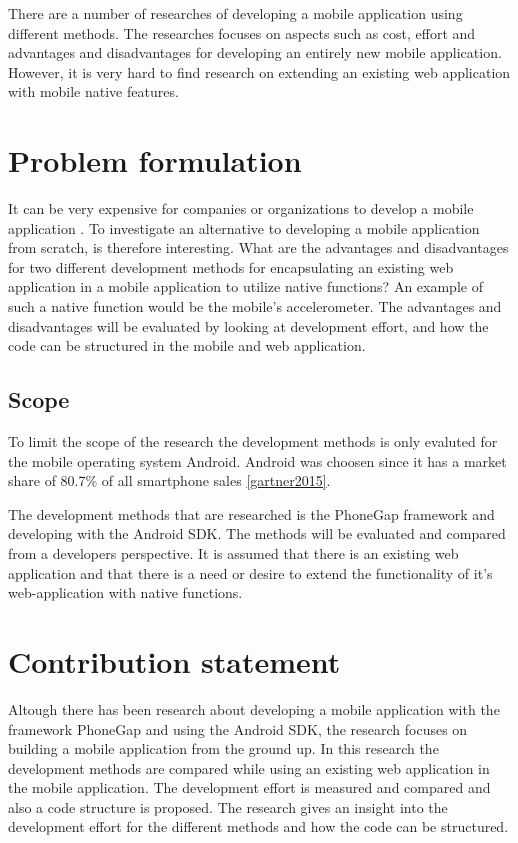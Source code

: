 There are a number of researches of developing a mobile application using different methods. The researches focuses on aspects such as cost, effort and advantages and disadvantages for developing an entirely new mobile application. However, it is very hard to find research on extending an existing web application with mobile native features. 

\section{Problem formulation}\label{section-problem-formulation}
It can be very expensive for companies or organizations to develop a mobile application \cite{kohan2015}. To investigate an alternative to developing a mobile application from scratch, is therefore interesting.
What are the advantages and disadvantages for two different development methods for encapsulating an existing web application in a mobile application to utilize native functions? An example of such a native function would be the mobile's accelerometer. The advantages and disadvantages will be evaluated by looking at development effort, and how the code can be structured in the mobile and web application. 

\subsection{Scope} \label{subsection-scope}
To limit the scope of the research the development methods is only evaluted for the mobile operating system Android. Android was choosen since it has a market share of 80.7\% of all smartphone sales \ref{gartner2015}.

The development methods that are researched is the PhoneGap framework and developing with the Android SDK. The methods will be evaluated and compared from a developers perspective. It is assumed that there is an existing web application and that there is a need or desire to extend the functionality of it's web-application with native functions.

\section{Contribution statement}\label{section-contribution-statement}
Altough there has been research about developing a mobile application with the framework PhoneGap and using the Android SDK, the research focuses on building a mobile application from the ground up. In this research the development methods are compared while using an existing web application in the mobile application. The development effort is measured and compared and also a code structure is proposed. The research gives an insight into the development effort for the different methods and how the code can be structured.

